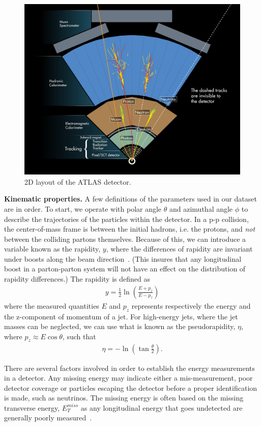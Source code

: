 \documentclass[12pt,a4paper]{amsart}
\begin{document}
\begin{figure}
\centering
\includegraphics[width=.8\textwidth]{figures/ATLAS_layout_2D.jpg}
\caption{2D layout of the ATLAS detector.~\cite{ATLAS_2D}}
\label{fig:ATLAS_layout_2D}
\end{figure}

\textbf{Kinematic properties.}  A few definitions of the parameters used in our dataset are in order. To start, we operate with polar angle $\theta$ and azimuthal angle $\phi$ to describe the trajectories of the particles within the detector. In a p-p collision, the center-of-mass frame is between the initial hadrons, i.e. the protons, and \textit{not} between the colliding partons themselves. Because of this, we can introduce a variable known as the rapidity, $y$, where the differences of rapidity are invariant under boosts along the beam direction~\cite{Thomson:2019}. (This insures that any longitudinal boost in a parton-parton system will not have an effect on the distribution of rapidity differences.) The rapidity is defined as
\begin{align}
y = \frac{1}{2}\ln\left(\frac{E+p_z}{E-p_z}\right) \label{eq:rapidity}
\end{align}
where the measured quantities $E$ and $p_z$ represents respectively the energy and the z-component of momentum of a jet. For high-energy jets, where the jet masses can be neglected, we can use what is known as the pseudorapidity, $\eta$, where $p_z\approx E\cos\theta$, such that
\begin{align}
\eta = -\ln (\tan\frac{\theta}{2}). \label{eq:pseudorapidity}
\end{align}

There are several factors involved in order to establish the energy measurements in a detector. Any missing energy may indicate either a mis-measurement, poor detector coverage or particles escaping the detector before a proper identification is made, such as neutrinos. The missing energy is often based on the missing transverse energy, $E_T^{miss}$ as any longitudinal energy that goes undetected are generally poorly measured~\cite{Green:2004}.
\end{document}
